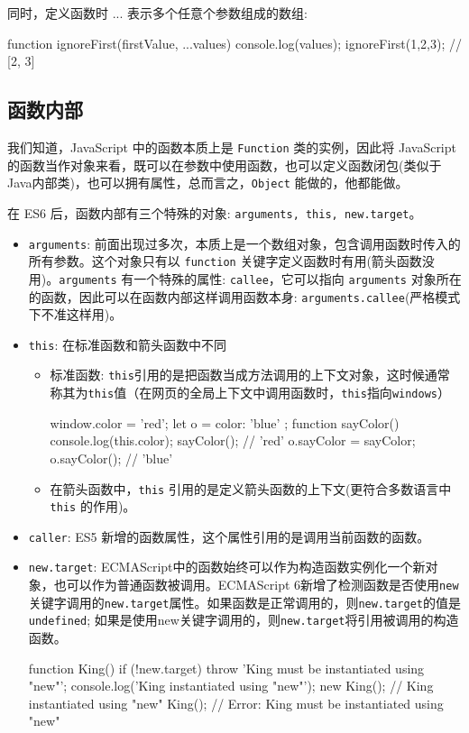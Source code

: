同时，定义函数时 ... 表示多个任意个参数组成的数组:

\begin{JavaScript}
function ignoreFirst(firstValue, ...values) {   
    console.log(values); 
}
ignoreFirst(1,2,3);  // [2, 3]
\end{JavaScript}

\subsection{函数内部}

我们知道，JavaScript 中的函数本质上是 \texttt{Function} 类的实例，因此将 JavaScript 的函数当作对象来看，既可以在参数中使用函数，也可以定义函数闭包(类似于Java内部类)，也可以拥有属性，总而言之，\texttt{Object} 能做的，他都能做。

在 ES6 后，函数内部有三个特殊的对象: \texttt{arguments, this, new.target}。

\begin{itemize}
    \item \texttt{arguments}: 前面出现过多次，本质上是一个数组对象，包含调用函数时传入的所有参数。这个对象只有以 \texttt{function} 关键字定义函数时有用(箭头函数没用)。\texttt{arguments} 有一个特殊的属性: \texttt{callee}，它可以指向 \texttt{arguments} 对象所在的函数，因此可以在函数内部这样调用函数本身: \texttt{arguments.callee}(严格模式下不准这样用)。
    \item \texttt{this}: 在标准函数和箭头函数中不同
    \begin{itemize}
        \item 标准函数: \texttt{this}引用的是把函数当成方法调用的上下文对象，这时候通常称其为\texttt{this}值（在网页的全局上下文中调用函数时，\texttt{this}指向\texttt{windows}）
\begin{JavaScript}
window.color = 'red';  
let o = { color: 'blue' }; 
function sayColor() {   
    console.log(this.color); 
} 
sayColor();    // 'red' 
o.sayColor = sayColor; 
o.sayColor();  // 'blue'
\end{JavaScript}
        \item 在箭头函数中，\texttt{this} 引用的是定义箭头函数的上下文(更符合多数语言中 \texttt{this} 的作用)。
    \end{itemize}
    \item \texttt{caller}: ES5 新增的函数属性，这个属性引用的是调用当前函数的函数。
    \item \texttt{new.target}: ECMAScript中的函数始终可以作为构造函数实例化一个新对象，也可以作为普通函数被调用。ECMAScript 6新增了检测函数是否使用\texttt{new}关键字调用的\texttt{new.target}属性。如果函数是正常调用的，则\texttt{new.target}的值是\texttt{undefined}; 如果是使用new关键字调用的，则\texttt{new.target}将引用被调用的构造函数。
\begin{JavaScript}
function King() {
    if (!new.target) {
        throw 'King must be instantiated using "new"';
    }
    console.log('King instantiated using "new"');
}
new King(); // King instantiated using "new" 
King();     // Error: King must be instantiated using "new" 
\end{JavaScript}
\end{itemize}

